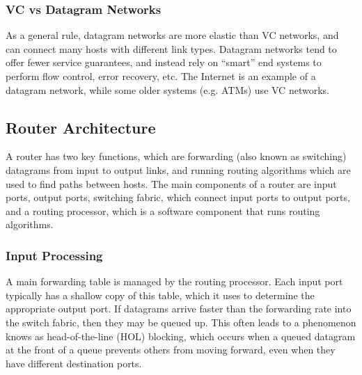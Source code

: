 \documentclass[12pt,titlepage]{article}
\begin{document}
      \subsubsection{VC vs Datagram Networks}
        As a general rule, datagram networks are more elastic than VC networks, and can connect many hosts with different link types. Datagram networks
        tend to offer fewer service guarantees, and instead rely on ``smart'' end systems to perform flow control, error recovery, etc. The Internet is an
        example of a datagram network, while some older systems (e.g. ATMs) use VC networks.

    \subsection{Router Architecture}
      A router has two key functions, which are forwarding (also known as switching) datagrams from input to output links, and running routing algorithms
      which are used to find paths between hosts. The main components of a router are input ports, output ports, switching fabric, which connect input
      ports to output ports, and a routing processor, which is a software component that runs routing algorithms.

      \subsubsection{Input Processing}
        A main forwarding table is managed by the routing processor. Each input port typically has a shallow copy of this table, which it uses to determine
        the appropriate output port. If datagrams arrive faster than the forwarding rate into the switch fabric, then they may be queued up. This often leads
        to a phenomenon knows as head-of-the-line (HOL) blocking, which occurs when a queued datagram at the front of a queue prevents others from moving
        forward, even when they have different destination ports.
\end{document}
